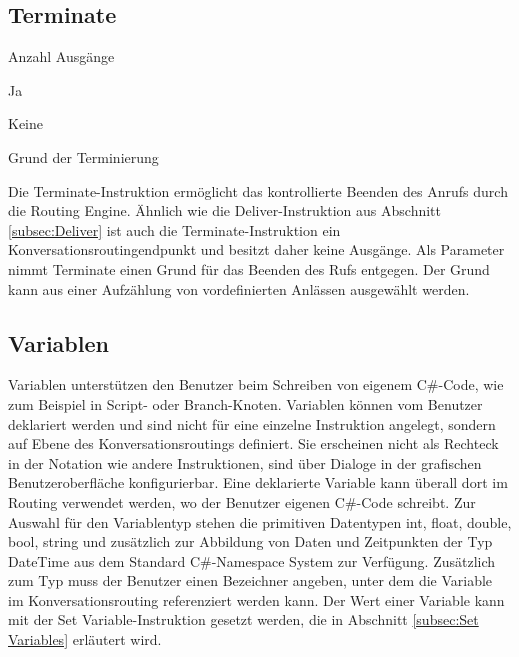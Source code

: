 \subsection{Terminate}
\begin{labeling}{Anzahl Ausgänge}
\item [Eingang] Ja
\item [Anzahl Ausgänge] Keine
\item [Parameter] Grund der Terminierung
\item [Beschreibung] Die Terminate-Instruktion ermöglicht das kontrollierte Beenden des Anrufs durch die Routing Engine. Ähnlich wie die Deliver-Instruktion aus Abschnitt \ref{subsec:Deliver} ist auch die Terminate-Instruktion ein Konversationsroutingendpunkt und besitzt daher keine Ausgänge. Als Parameter nimmt Terminate einen Grund für das Beenden des Rufs entgegen. Der Grund kann aus einer Aufzählung von vordefinierten Anlässen ausgewählt werden.
\end{labeling}

\subsection{Variablen}
\label{subsec:Variablen}
Variablen unterstützen den Benutzer beim Schreiben von eigenem C\#-Code, wie zum Beispiel in Script- oder Branch-Knoten. Variablen können vom Benutzer deklariert werden und sind nicht für eine einzelne Instruktion angelegt, sondern auf Ebene des Konversationsroutings definiert. Sie erscheinen nicht als Rechteck in der Notation wie andere Instruktionen, sind über Dialoge in der grafischen Benutzeroberfläche konfigurierbar. Eine deklarierte Variable kann überall dort im Routing verwendet werden, wo der Benutzer eigenen C\#-Code schreibt. Zur Auswahl für den Variablentyp stehen die primitiven Datentypen int, float, double, bool, string und zusätzlich zur Abbildung von Daten und Zeitpunkten der Typ DateTime aus dem Standard C\#-Namespace System zur Verfügung. Zusätzlich zum Typ muss der Benutzer einen Bezeichner angeben, unter dem die Variable im Konversationsrouting referenziert werden kann. Der Wert einer Variable kann mit der Set Variable-Instruktion gesetzt werden, die in Abschnitt \ref{subsec:Set Variables} erläutert wird. 

